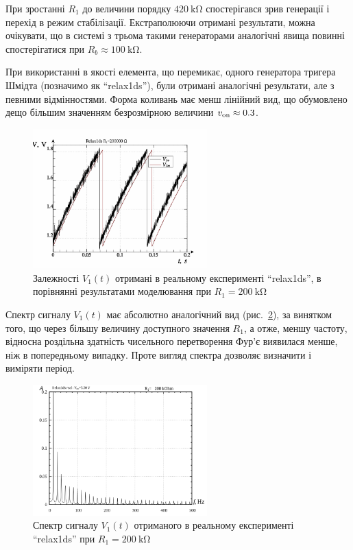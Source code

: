 При зростанні
$ R_1 $ до величини порядку
$ \SI{420}{\kilo \ohm} $ спостерігався зрив генерації і перехід в
режим стабілізації. Екстраполюючи отримані результати, можна
очікувати, що в системі з трьома такими генераторами аналогічні
явища повинні спостерігатися при
$ R_b \approx \SI{100}{\kilo \ohm} $.

При використанні в якості елемента, що перемикає, одного
генератора тригера Шмідта (позначимо як ``relax1ds''), були отримані
аналогічні результати, але з певними відмінностями. Форма
коливань має менш лінійний вид, що обумовлено дещо більшим
значенням безрозмірною величини
$ v _\mathrm{on} \approx 0.3 $.

\begin{figure}[htb!]
  \centerline{\includegraphics[width=0.6\textwidth]{p/relax1ds_read_cmp-p_t_r1=200k.png} }
\caption{Залежності $ V_1 (t) $ отримані в реальному експерименті ``relax1ds'', в порівнянні результатами моделювання при $ R_1 = \SI{200}{\kilo \ohm} $}
\label{atu:f:relax1ds_read_cmp-p_t_r1}
\end{figure}

Спектр сигналу
$V_1(t) $ має абсолютно аналогічний вид (рис.~\ref{atu:f:relax1ds_f_r1}), за
винятком того, що через більшу величину доступного значення
$R_1$, а отже, меншу частоту, відносна роздільна здатність
чисельного перетворення Фур'є виявилася менше, ніж в
попередньому випадку. Проте вигляд спектра дозволяє визначити
і виміряти період.

\begin{figure}[htb!]
  \centerline{\includegraphics[width=0.6\textwidth]{p/relax1ds_f_200000.png} }
\caption{Спектр сигналу $ V_1 (t) $ отриманого в реальному експерименті ``relax1ds'' при $ R_1 = \SI{200}{\kilo \ohm} $}
  \label{atu:f:relax1ds_f_r1}
\end{figure}

